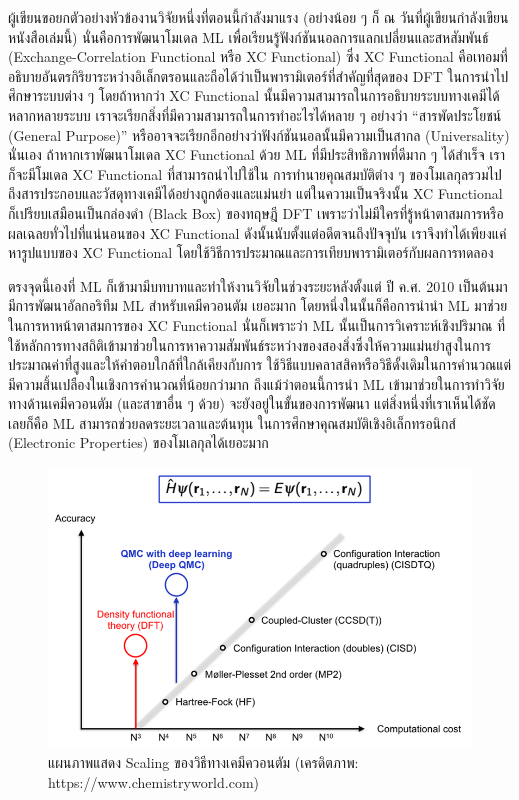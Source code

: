 ผู้เขียนขอยกตัวอย่างหัวข้องานวิจัยหนึ่งที่ตอนนี้กำลังมาแรง (อย่างน้อย ๆ ก็ ณ วันที่ผู้เขียนกำลังเขียนหนังสือเล่มนี้) นั่นคือการพัฒนาโมเดล ML 
เพื่อเรียนรู้ฟังก์ชันนอลการแลกเปลี่ยนและสหสัมพันธ์ (Exchange-Correlation Functional หรือ XC Functional)\autocite{balabin2009a} 
ซึ่ง XC Functional คือเทอมที่อธิบายอันตรกิริยาระหว่างอิเล็กตรอนและถือได้ว่าเป็นพารามิเตอร์ที่สำคัญที่สุดของ DFT ในการนำไปศึกษาระบบต่าง ๆ 
โดยถ้าหากว่า XC Functional นั้นมีความสามารถในการอธิบายระบบทางเคมีได้หลากหลายระบบ เราจะเรียกสิ่งที่มีความสามารถในการทำอะไรได้หลาย ๆ 
อย่างว่า \enquote{สารพัดประโยชน์ (General Purpose)} หรืออาจจะเรียกอีกอย่างว่าฟังก์ชันนอลนั้นมีความเป็นสากล (Universality) นั่นเอง 
ถ้าหากเราพัฒนาโมเดล XC Functional ด้วย ML ที่มีประสิทธิภาพที่ดีมาก ๆ ได้สำเร็จ เราก็จะมีโมเดล XC Functional ที่สามารถนำไปใช้ใน%
การทำนายคุณสมบัติต่าง ๆ ของโมเลกุลรวมไปถึงสารประกอบและวัสดุทางเคมีได้อย่างถูกต้องและแม่นยำ แต่ในความเป็นจริงนั้น XC Functional 
ก็เปรียบเสมือนเป็นกล่องดำ (Black Box) ของทฤษฎี DFT เพราะว่าไม่มีใครที่รู้หน้าตาสมการหรือผลเฉลยทั่วไปที่แน่นอนของ XC Functional 
ดังนั้นนับตั้งแต่อดีตจนถึงปัจจุบัน เราจึงทำได้เพียงแค่หารูปแบบของ XC Functional โดยใช้วิธีการประมาณและการเทียบพารามิเตอร์กับผลการทดลอง 

ตรงจุดนี้เองที่ ML ก็เข้ามามีบทบาทและทำให้งานวิจัยในช่วงระยะหลังตั้งแต่ ปี ค.ศ. 2010 เป็นต้นมามีการพัฒนาอัลกอริทึม ML สำหรับเคมีควอนตัม%
เยอะมาก โดยหนึ่งในนั้นก็คือการนำนำ ML มาช่วยในการหาหน้าตาสมการของ XC Functional นั่นก็เพราะว่า ML นั้นเป็นการวิเคราะห์เชิงปริมาณ%
ที่ใช้หลักการทางสถิติเข้ามาช่วยในการหาความสัมพันธ์ระหว่างของสองสิ่งซึ่งให้ความแม่นยำสูงในการประมาณค่าที่สูงและให้คำตอบใกล้ที่ใกล้เคียงกับการ%
ใช้วิธีแบบคลาสสิคหรือวิธีดั้งเดิมในการคำนวณแต่มีความสิ้นเปลืองในเชิงการคำนวณที่น้อยกว่ามาก ถึงแม้ว่าตอนนี้การนำ ML เข้ามาช่วยในการทำวิจัย%
ทางด้านเคมีควอนตัม (และสาขาอื่น ๆ ด้วย) จะยังอยู่ในขั้นของการพัฒนา แต่สิ่งหนึ่งที่เราเห็นได้ชัดเลยก็คือ ML สามารถช่วยลดระยะเวลาและต้นทุน%
ในการศึกษาคุณสมบัติเชิงอิเล็กทรอนิกส์ (Electronic Properties) ของโมเลกุลได้เยอะมาก

\begin{figure}[htbp]
    \centering
    \includegraphics[width=0.9\linewidth]{fig/qm_scaling.png}
    \caption{แผนภาพแสดง Scaling ของวิธีทางเคมีควอนตัม (เครดิตภาพ: https://www.chemistryworld.com)}
    \label{fig:qm_scaling}
\end{figure}

